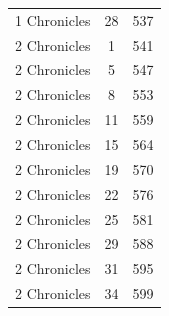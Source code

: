 \documentclass{article}
\newlength{\minipageheight}
\newlength{\minipagewidth}
\begin{document}
\begin{minipage}[r][\minipageheight][t]{\minipagewidth}
\begin{center}
\begin{tabular}{|c|c|c|}
            1 Chronicles & 28      & 537   \\
            2 Chronicles & 1       & 541   \\
            2 Chronicles & 5       & 547   \\
            2 Chronicles & 8       & 553   \\
            2 Chronicles & 11      & 559   \\
            2 Chronicles & 15      & 564   \\
            2 Chronicles & 19      & 570   \\
            2 Chronicles & 22      & 576   \\
            2 Chronicles & 25      & 581   \\
            2 Chronicles & 29      & 588   \\
            2 Chronicles & 31      & 595   \\
            2 Chronicles & 34      & 599   \\
            \hline
        \end{tabular}
    \end{center}
\end{minipage}%
\end{document}
